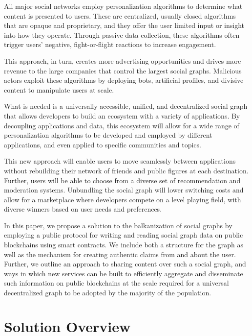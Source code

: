\documentclass[12pt,letterpaper]{article}
\begin{document}
All major social networks employ personalization algorithms to determine what content is
presented to users. These are centralized, usually closed algorithms that are opaque and
proprietary, and they offer the user limited input or insight into how they operate.
Through passive data collection, these algorithms often trigger users' negative,
fight-or-flight reactions to increase engagement.\cite{psychology_today_2017}

This approach, in turn, creates more advertising opportunities and drives more revenue to
the large companies that control the largest social graphs. Malicious actors exploit these
algorithms by deploying bots, artificial profiles, and divisive content to manipulate
users at scale.


What is needed is a universally accessible, unified, and decentralized social graph that
allows developers to build an ecosystem with a variety of applications. By decoupling
applications and data, this ecosystem will allow for a wide range of personalization
algorithms to be developed and employed by different applications, and even applied to
specific communities and topics.

This new approach will enable users to move seamlessly between applications without
rebuilding their network of friends and public figures at each destination. Further, users
will be able to choose from a diverse set of recommendation and moderation systems.
Unbundling the social graph will lower switching costs and allow for a marketplace where
developers compete on a level playing field, with diverse winners based on user needs and
preferences.


In this paper, we propose a solution to the balkanization of social graphs by employing a
public protocol for writing and reading social graph data on public blockchains using
smart contracts. We include both a structure for the graph as well as the mechanism for
creating authentic claims from and about the user. Further, we outline an approach to
sharing content over such a social graph, and ways in which new services can be built to
efficiently aggregate and disseminate such information on public blockchains at the scale
required for a universal decentralized graph to be adopted by the majority of the
population.

\section{Solution Overview}\label{sec:solution_overview}
\end{document}
